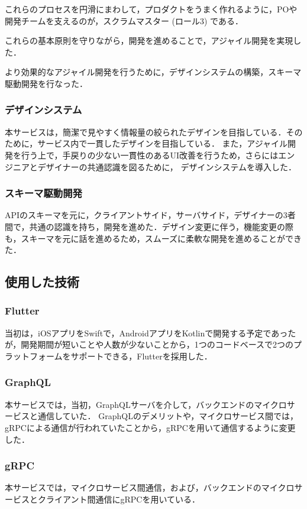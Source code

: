 これらのプロセスを円滑にまわして，プロダクトをうまく作れるように，POや開発チームを支えるのが，スクラムマスター (ロール3) である．

これらの基本原則を守りながら，開発を進めることで，アジャイル開発を実現した．

より効果的なアジャイル開発を行うために，デザインシステムの構築，スキーマ駆動開発を行なった．

\subsubsection{デザインシステム}
本サービスは，簡潔で見やすく情報量の絞られたデザインを目指している．そのために，サービス内で一貫したデザインを目指している．
また，アジャイル開発を行う上で，手戻りの少ない一貫性のあるUI改善を行うため，さらにはエンジニアとデザイナーの共通認識を図るために，
デザインシステムを導入した．

\subsubsection{スキーマ駆動開発}
APIのスキーマを元に，クライアントサイド，サーバサイド，デザイナーの3者間で，共通の認識を持ち，開発を進めた．デザイン変更に伴う，機能変更の際も，スキーマを元に話を進めるため，スムーズに柔軟な開発を進めることができた．

\subsection{使用した技術}
\subsubsection{Flutter}
当初は，iOSアプリをSwiftで，AndroidアプリをKotlinで開発する予定であったが，開発期間が短いことや人数が少ないことから，1つのコードベースで2つのプラットフォームをサポートできる，Flutterを採用した．

\subsubsection{GraphQL}
本サービスでは，当初，GraphQLサーバを介して，バックエンドのマイクロサービスと通信していた．
GraphQLのデメリットや，マイクロサービス間では，gRPCによる通信が行われていたことから，gRPCを用いて通信するように変更した．

\subsubsection{gRPC}
本サービスでは，マイクロサービス間通信，および，バックエンドのマイクロサービスとクライアント間通信にgRPCを用いている．

